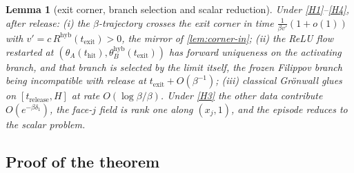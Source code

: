 \documentclass[11pt]{article}
\newtheorem{lemma}[lemma]{Lemma}
\theoremstyle{definition}
\theoremstyle{remark}
\newcommand{\thit}{t_{\mathrm{hit}}}
\newcommand{\texit}{t_{\mathrm{exit}}}
\newcommand{\trel}{t_{\mathrm{release}}}
\newcommand{\hyb}{\mathrm{hyb}}
\begin{document}
\begin{lemma}[exit corner, branch selection and scalar reduction]\label{lem:corner-out}
Under \eqref{H1}--\eqref{H4}, after release: (i) the $\beta$-trajectory crosses
the exit corner in time $\tfrac{1}{\beta v'}(1+o(1))$ with
$v'=c\,R^{\hyb}(\texit)>0$, the mirror of \cref{lem:corner-in}; (ii) the ReLU flow
restarted at $(\theta_A(\thit),\theta_B^{\hyb}(\texit))$ has forward uniqueness on
the activating branch, and that branch is selected by the limit itself, the
frozen Filippov branch~\cite{Fil88} being incompatible with release at
$\texit+O(\beta^{-1})$; (iii) classical Gr\"onwall glues on $[\trel,H]$ at rate
$O(\log\beta/\beta)$. Under \eqref{H3} the other data contribute
$O(e^{-\beta\delta_1})$, the face-$j$ field is rank one along $(x_j,1)$, and the
episode reduces to the scalar problem.
\end{lemma}

\subsection{Proof of the theorem}\label{sec:proofmain}
\end{document}
